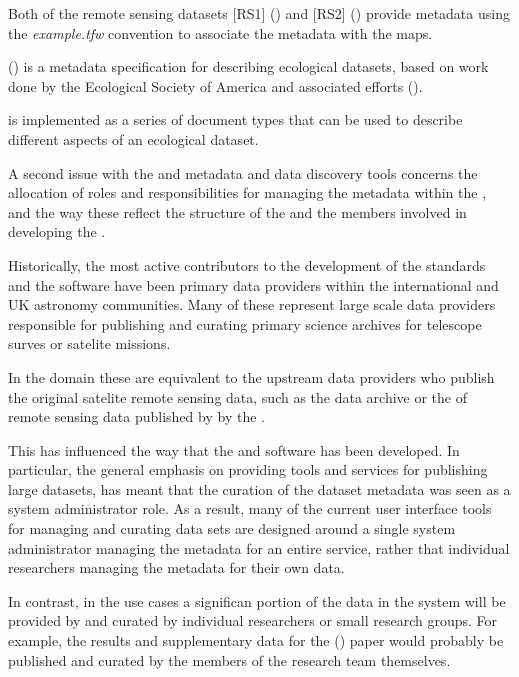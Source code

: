 \documentclass{article}
\begin{document}
Both of the remote sensing datasets
[RS1] (\cite{saatchi-2011})
and
[RS2] (\cite{baccini-2012})
provide
\cite{format-world}
metadata 
using the \textit{example.tfw} convention to associate the metadata
with the \cite{format-geotiff} maps.

 (\cite{eml}) is a metadata specification for describing ecological datasets,
based on work done by the Ecological Society of America and associated efforts
 (\cite{michener-1997}).

\cite{eml} is implemented as a series of \cite{format-xml} document types that can be
used to describe different aspects of an ecological dataset.

A second issue with the \cite{ivoa} and \cite{astro} metadata \cite{ivoa.reg} and
data discovery tools concerns the allocation of roles and responsibilities for
managing the metadata within the \cite{ivoa.reg}, and the way these reflect the
structure of the \cite{ivoa} and the members involved in developing the \cite{ivoa.reg}.

Historically, the most active contributors to the development of the \cite{ivoa}
standards and the \cite{astro} software have been primary data providers within
the international and UK astronomy communities.
Many of these represent large scale data providers responsible for publishing and
curating primary science archives for telescope surves or satelite missions.

In the \cite{trop} domain these are equivalent to the upstream data providers who publish
the original satelite remote sensing data, such as the \cite{landsat}
data archive or the  of remote sensing data published by by the
\cite{usgs}.

This has influenced the way that the \cite{ivoa} and \cite{astro} software has
been developed. In particular, the general emphasis on providing tools and services
for publishing large datasets, has meant that the curation of the dataset
metadata was seen as a system administrator role.
As a result, many of the current user interface tools for managing and curating data sets
are designed around a single system administrator managing the metadata for an entire
service, rather that individual researchers managing the metadata for their own data.

In contrast, in the \cite{trop} use cases a significan portion of the data in the system
will be provided by and curated by individual researchers or small research groups.
For example, the results and supplementary data for the (\cite{mitchard-2014}) paper would
probably be published and curated by the members of the research team themselves.
\end{document}
